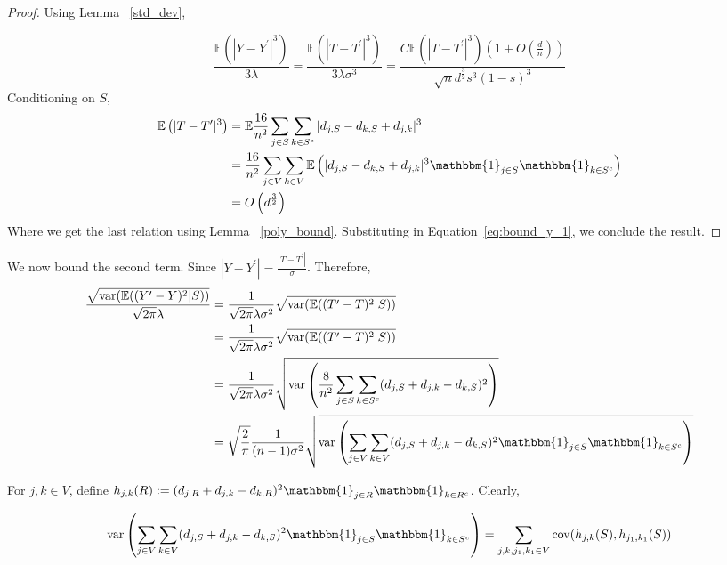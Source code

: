 \documentclass[final,12pt]{colt2018}
\begin{document}
\begin{proof}
Using Lemma ~\ref{std_dev},

\begin{equation}
\frac{\mathbb{E}\left(|Y-Y^{\prime}|^3\right)}{3\lambda} = \frac{\mathbb{E}\left(|T-T^{\prime}|^3\right)}{3\lambda \sigma^{3}} = \frac{C\mathbb{E}\left(|T-T^{\prime}|^3\right)(1+O\left(\frac{d}{n}\right))}{\sqrt{n}d^{\frac{3}{2}}s^3(1-s)^3}
\label{eq:bound_y_1}
\end{equation}
Conditioning on $S$, 
\begin{align*}
\mathbb{E}\left(|T-T^{\prime}|^3\right) &= \mathbb{E} \frac{16}{n^2} \sum_{j \in S} \sum_{k \in S^c} |d_{j,S} - d_{k,S} + d_{j,k}|^3\\
& = \frac{16}{n^2} \sum_{j \in V} \sum_{k \in V} \mathbb{E}\left(|d_{j,S} - d_{k,S} + d_{j,k}|^3 \mathbbm{1}_{j \in S}\mathbbm{1}_{k\in S^c}\right) \\
&=  O\left(d^{\frac{3}{2}}\right)
\end{align*}
Where we get the last relation using Lemma ~\ref{poly_bound}. Substituting in Equation~\ref{eq:bound_y_1}, we conclude the result.
%
\end{proof}

We now bound the second term.
Since $|Y-Y^{\prime}| = \frac{|T - T^{\prime}|}{\sigma}$. Therefore, 
\begin{align}
 \frac{\sqrt{\mathrm{var}(\mathbb{E}((Y^{\prime}-Y)^2|S))}}{\sqrt{2\pi}\lambda} &= \frac{1}{\sqrt{2\pi}\lambda \sigma^2}\sqrt{\mathrm{var}(\mathbb{E}((T^{\prime}-T)^2|S))}   \nonumber \\
  &= \frac{1}{\sqrt{2\pi}\lambda  \sigma^2}\sqrt{\mathrm{var}(\mathbb{E}((T^{\prime}-T)^2|S))}  \nonumber \\
  &= \frac{1}{\sqrt{2\pi}\lambda  \sigma^2}\sqrt{\mathrm{var}\left(\frac{8}{n^2}\sum_{j\in S}\sum_{k \in S^c}(d_{j,S}+d_{j,k}-d_{k,S})^2\right)} \nonumber \\
 &= \sqrt{\frac{2}{\pi}}\frac{1}{ (n-1) \sigma^2}\sqrt{\mathrm{var}\left(\sum_{j\in V}\sum_{k \in V}(d_{j,S}+d_{j,k}-d_{k,S})^2\mathbbm{1}_{j\in S}\mathbbm{1}_{k \in S^c}\right)}  \label{second_quantity}
\end{align} 

For $j,k \in V$, define $h_{j,k} (R) := (d_{j,R}+d_{j,k}-d_{k,R})^2\mathbbm{1}_{j\in R}\mathbbm{1}_{k \in R^c}$. Clearly, 


\begin{equation}
 \mathrm{var}\left(\sum_{j\in V}\sum_{k \in V}(d_{j,S}+d_{j,k}-d_{k,S})^2\mathbbm{1}_{j\in S}\mathbbm{1}_{k \in S^c}\right) = \sum_{j,k,j_1,k_1 \in V} \mathrm{cov}(h_{j,k}(S),h_{j_1,k_1}(S))
 \label{var_covar_1}
\end{equation}
\end{document}
